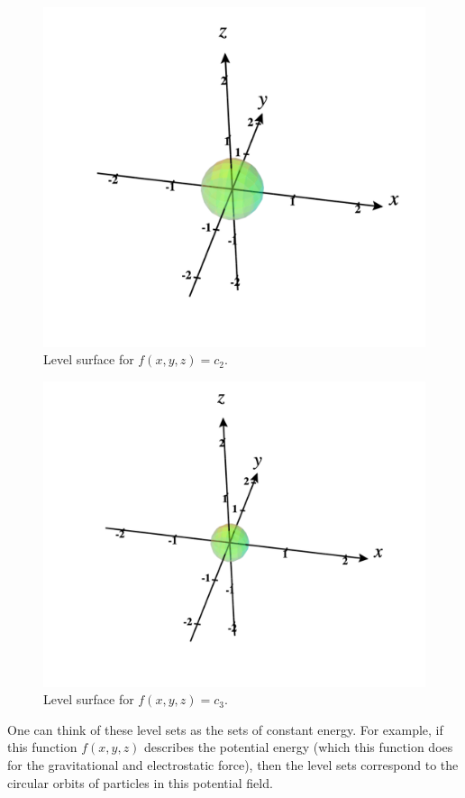 \documentclass[12pt]{article} %
\begin{document}
\begin{solution}
\begin{enumerate}[(a)]
        \begin{figure}[H]
        \centering
        \includegraphics[width=.6\textwidth]{Images/level_surface_c2.png}
        \caption{Level surface for $f(x,y,z)=c_2$.}
    \end{figure}
        \begin{figure}[H]
        \centering
        \includegraphics[width=.6\textwidth]{Images/level_surface_c3.png}
        \caption{Level surface for $f(x,y,z)=c_3$.}
    \end{figure}
\end{enumerate}
One can think of these level sets as the sets of constant energy. For example, if this function $f(x,y,z)$ describes the potential energy (which this function does for the gravitational and electrostatic force), then the level sets correspond to the circular orbits of particles in this potential field. 
\end{solution}
\end{document}
